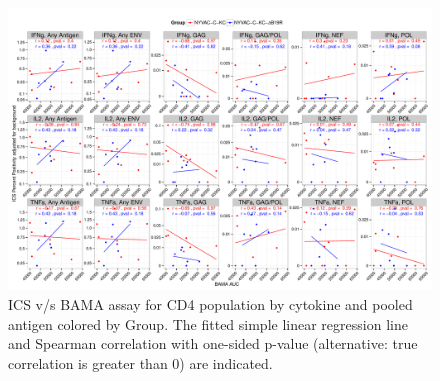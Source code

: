 \documentclass[11pt]{article}\usepackage[]{graphicx}\usepackage[]{color}
\makeatletter
\def\maxwidth{ %
  \ifdim\Gin@nat@width>\linewidth
    \linewidth
  \else
    \Gin@nat@width
  \fi
}
\newenvironment{knitrout}{}{} %
\makeatother
\begin{document}
\newpage
\pagestyle{lscape}
\begin{landscape}








\begin{figure}[H]
\begin{center}
\begin{knitrout}
\color{fgcolor}
\includegraphics[width=\maxwidth]{figure/corrplot_CD4_BAMA_pooledAntigen-1} 

\end{knitrout}
\caption{ICS v/s BAMA assay for CD4 population by cytokine and pooled antigen colored by Group. The fitted simple linear regression line and Spearman correlation with one-sided p-value (alternative: true correlation is greater than 0) are indicated.}
\end{center}
\end{figure}







\end{landscape}
\end{document}
